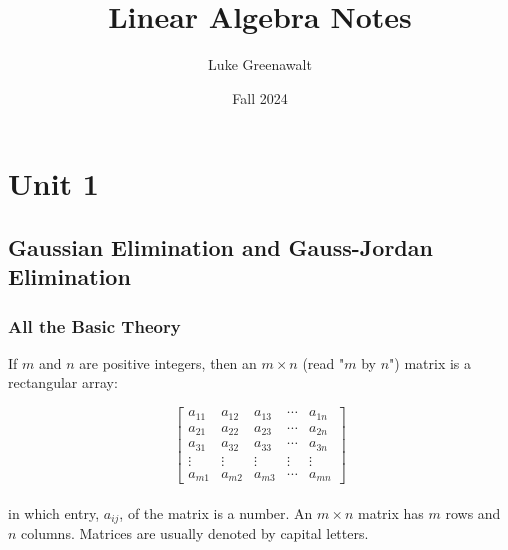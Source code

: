 \documentclass{report}
\title{Linear Algebra Notes}
\author{Luke Greenawalt}
\date{Fall 2024}
\begin{document}
\maketitle
\tableofcontents
\chapter{Unit 1}
\section{Gaussian Elimination and Gauss-Jordan Elimination}

\subsection{All the Basic Theory}

\begin{tcolorbox}[title = Definition of a Matrix]
 	If $m$ and $n$ are positive integers, then an $m \times n$ (read "$m$ by $n$") matrix is a rectangular array:

$$
\begin{bmatrix}
    a_{11} & a_{12} & a_{13} & \cdots & a_{1n} \\
    a_{21} & a_{22} & a_{23} & \cdots & a_{2n} \\
    a_{31} & a_{32} & a_{33} & \cdots & a_{3n} \\
    \vdots & \vdots & \vdots & \vdots & \vdots \\
    a_{m1} & a_{m2} & a_{m3} & \cdots & a_{mn} 
\end{bmatrix}
$$\\


\noindent in which entry, $a_{ij}$, of the matrix is a number. An $m \times n$ matrix has $m$ rows and $n$ columns. Matrices are usually denoted by capital letters.

\end{tcolorbox}
\end{document}
